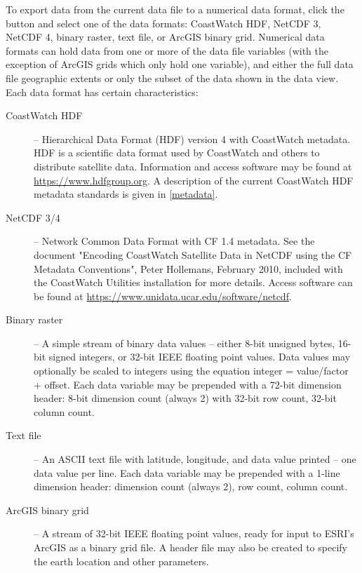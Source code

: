 To export data from the current data file to a numerical data
format, click the  button and select one
of the data formats: CoastWatch HDF, NetCDF 3, NetCDF 4, binary raster, text file, or
ArcGIS binary grid.  Numerical data formats can hold data from
one or more of the data file variables (with the exception of
ArcGIS grids which only hold one variable), and either the full
data file geographic extents or only the subset of the data shown
in the data view.  Each data format has certain characteristics:
\begin{description}

\item[CoastWatch HDF] -- Hierarchical Data Format (HDF) version 4
with CoastWatch metadata. HDF is a scientific data format used by
CoastWatch and others to distribute satellite data. Information
and access software may be found at
\url{https://www.hdfgroup.org}. A description of the current
CoastWatch HDF metadata standards is given in \autoref{metadata}.

\item[NetCDF 3/4] -- Network Common Data Format with CF 1.4 
metadata.  See the document "Encoding CoastWatch Satellite Data 
in NetCDF using the CF Metadata Conventions", Peter Hollemans, February 2010,
included with the CoastWatch Utilities installation for more details.  Access
software can be found at \url{https://www.unidata.ucar.edu/software/netcdf}.

\item[Binary raster] -- A simple stream of binary data values --
either 8-bit unsigned bytes, 16-bit signed integers, or 32-bit
IEEE floating point values. Data values may optionally be scaled
to integers using the equation integer = value/factor +
offset. Each data variable may be prepended with a 72-bit
dimension header: 8-bit dimension count (always 2) with 32-bit
row count, 32-bit column count.

\item[Text file] -- An ASCII text file with latitude, longitude,
and data value printed -- one data value per line. Each data
variable may be prepended with a 1-line dimension header:
dimension count (always 2), row count, column count.

\item[ArcGIS binary grid] -- A stream of 32-bit IEEE floating
point values, ready for input to ESRI's ArcGIS as a binary grid
file. A header file may also be created to specify the earth
location and other parameters.

\end{description}

